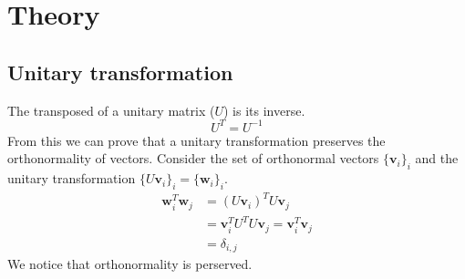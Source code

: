 \documentclass[reprint,english,notitlepage,nofootinbib]{revtex4-1}  %
\begin{document}
\section{Theory}

\subsection{Unitary transformation}
The transposed of a unitary matrix ($U$) is its inverse.
\begin{equation*}
	U^T = U^{-1}
\end{equation*}
From this we can prove that a unitary transformation preserves the orthonormality of vectors. Consider the set of orthonormal vectors $\{ \mathbf{v}_i \}_i$ and the unitary transformation $\{ U\mathbf{v}_i \}_i = \{ \mathbf{w}_i \}_i$.
\begin{align*}
	\mathbf{w}_i^T\mathbf{w}_j &= (U\mathbf{v}_i)^TU\mathbf{v}_j \\
	&= \mathbf{v}_i^TU^TU\mathbf{v}_j = \mathbf{v}_i^T\mathbf{v}_j \\
	&= \delta_{i,j}
\end{align*}
We notice that orthonormality is perserved.
\end{document}
